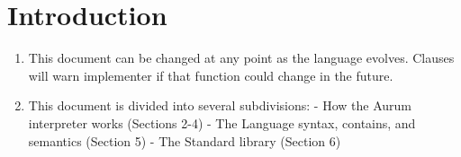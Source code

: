 \documentclass[12pt, letterpaper, oneside]{article}
\begin{document}
	\maketitle
	\renewcommand{\thepage}{Abstract-\roman{page}}
	\begin{abstract}
		This document specifies the syntax, form, and the process of \newline interpretation in the programming language Aurum. Its purpose is to explain how languages work, how that impacts the Aurum programming language, as well the form and style of the Aurum language. While this document isn't a full tutorial, it intends to serve as both a reference for Aurum programmers, as well an intro to the principles of interpreter design.
		\newline	
		Sections are included that clarify how various stages of the Aurum interpreter work, the syntax of Aurum, and includes documentation, and usage examples on its standard library functions.
		\newline
		This document will change as the Aurum programming language changes.
		
	\end{abstract}
	\renewcommand{\thepage}{\roman{page}}
	\newpage
	\tableofcontents
	\newpage
	\section{Introduction}
	\begin{enumerate}
		\item This document can be changed at any point as the language evolves. Clauses will warn implementer if that function could change in the future.
		\item This document is divided into several subdivisions:
		- How the Aurum interpreter works (Sections 2-4)
		- The Language syntax, contains, and semantics (Section 5)
		- The Standard library (Section 6)
	\end{enumerate}
	\newpage
\end{document}
